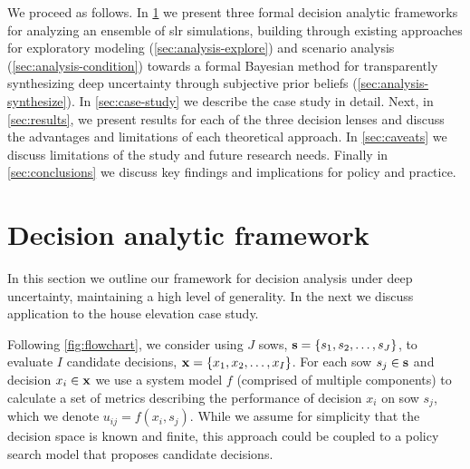 \documentclass{agujournal2019}
\begin{document}
We proceed as follows.
In \cref{sec:analysis} we present three formal decision analytic frameworks for analyzing an ensemble of \gls{slr} simulations, building through existing approaches for exploratory modeling (\cref{sec:analysis-explore}) and scenario analysis (\cref{sec:analysis-condition}) towards a formal Bayesian method for transparently synthesizing deep uncertainty through subjective prior beliefs (\cref{sec:analysis-synthesize}).
In \cref{sec:case-study} we describe the case study in detail.
Next, in \cref{sec:results}, we present results for each of the three decision lenses and discuss the advantages and limitations of each theoretical approach.
In \cref{sec:caveats} we discuss limitations of the study and future research needs.
Finally in \cref{sec:conclusions} we discuss key findings and implications for policy and practice.

\section{Decision analytic framework}\label{sec:analysis}

In this section we outline our framework for decision analysis under deep uncertainty, maintaining a high level of generality.
In the next we discuss application to the house elevation case study.

Following \cref{fig:flowchart}, we consider using $J$ \glspl{sow}, $\vb{s} = \qty{s_1, s_2, \ldots, s_J}$, to evaluate $I$ candidate decisions, $\vb{x} = \qty{x_1, x_2, \ldots, x_I}$.
For each \gls{sow} $s_j \in \vb{s}$ and decision $x_i \in \vb{x}$ we use a system model $f$ (comprised of multiple components) to calculate a set of metrics describing the performance of decision $x_i$ on \gls{sow} $s_j$, which we denote $u_{ij} = f(x_i, s_j)$.
While we assume for simplicity that the decision space is known and finite, this approach could be coupled to a policy search model that proposes candidate decisions.
\end{document}
